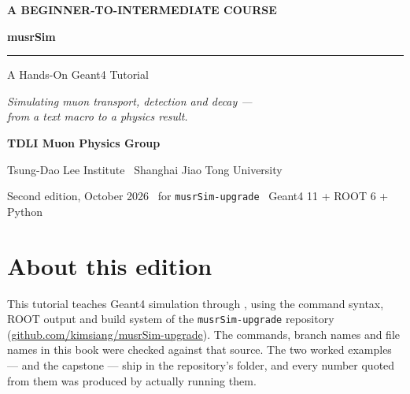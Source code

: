 \begin{titlepage}
\thispagestyle{empty}
\vspace*{38mm}
{\sffamily\bfseries\footnotesize\color{eblue}A BEGINNER-TO-INTERMEDIATE COURSE\par}
\vspace{14mm}
{\fontsize{64}{66}\selectfont\bfseries\color{navy}musrSim\par}
\vspace{5mm}
{\color{eblue}\rule{62mm}{2pt}\par}
\vspace{10mm}
{\fontsize{30}{36}\selectfont\color{navy}A Hands-On Geant4 Tutorial\par}
\vspace{14mm}
{\large\itshape\color{ink}Simulating muon transport, detection and decay ---\\
from a text macro to a physics result.\par}
\vfill
{\sffamily\bfseries\color{navy}TDLI Muon Physics Group\par}
\vspace{1.5mm}
{\sffamily\small\color{ink}Tsung-Dao Lee Institute \textperiodcentered\ Shanghai Jiao Tong University\par}
\vspace{2.5mm}
{\sffamily\scriptsize\color{muted}Second edition, October 2026 \textperiodcentered\ for \texttt{musrSim-upgrade} \textperiodcentered\ Geant4 11 + ROOT 6 + Python\par}
\end{titlepage}

\chapter*{About this edition}

This tutorial teaches Geant4 simulation through \musrSim, using the command syntax, ROOT output and build system of the \texttt{musrSim-upgrade} repository (\url{github.com/kimsiang/musrSim-upgrade}). The commands, branch names and file names in this book were checked against that source. The two worked examples ---  and the capstone  --- ship in the repository's  folder, and every number quoted from them was produced by actually running them.

